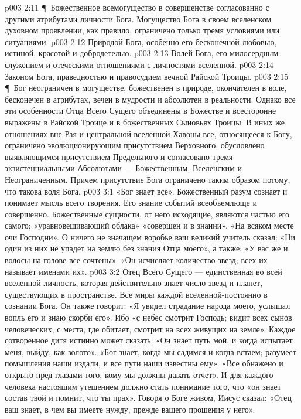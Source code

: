 \vs p003 2:11 \P\ Божественное всемогущество в совершенстве согласованно с другими атрибутами личности Бога. Могущество Бога в своем вселенском духовном проявлении, как правило, ограничено только тремя условиями или ситуациями:
\vs p003 2:12 \bibnobreakspace Природой Бога, особенно его бесконечной любовью, истиной, красотой и добродетелью.
\vs p003 2:13 \bibnobreakspace Волей Бога, его милосердным служением и отеческими отношениями с личностями вселенной.
\vs p003 2:14 \bibnobreakspace Законом Бога, праведностью и правосудием вечной Райской Троицы.
\vs p003 2:15 \P\ Бог неограничен в могуществе, божественен в природе, окончателен в воле, бесконечен в атрибутах, вечен в мудрости и абсолютен в реальности. Однако все эти особенности Отца Всего Сущего объединены в Божестве и всесторонне выражены в Райской Троице и в божественных Сыновьях Троицы. В иных же отношениях вне Рая и центральной вселенной Хавоны все, относящееся к Богу, ограничено эволюционирующим присутствием Верховного, обусловлено выявляющимся присутствием Предельного и согласовано тремя экзистенциальными Абсолютами --- Божественным, Вселенским и Неограниченным. Причем присутствие Бога ограничено таким образом потому, что такова воля Бога.
\vs p003 3:1 «Бог знает все». Божественный разум сознает и понимает мысль всего творения. Его знание событий всеобъемлюще и совершенно. Божественные сущности, от него исходящие, являются частью его самого; «уравновешивающий облака» «совершен и в знании». «На всяком месте очи Господни». О ничего не значащем воробье ваш великий учитель сказал: «Ни один из них не упадет на землю без знания Отца моего», а также: «У вас же и волосы на голове все сочтены». «Он исчисляет количество звезд; всех их называет именами их».
\vs p003 3:2 Отец Всего Сущего --- единственная во всей вселенной личность, которая действительно знает число звезд и планет, существующих в пространстве. Все миры каждой вселенной\hyp{}постоянно в сознании Бога. Он также говорит: «Я увидел страдание народа моего, услышал вопль его и знаю скорби его». Ибо «с небес смотрит Господь; видит всех сынов человеческих; с места, где обитает, смотрит на всех живущих на земле». Каждое сотворенное дитя истинно может сказать: «Он знает путь мой, и когда испытает меня, выйду, как золото». «Бог знает, когда мы садимся и когда встаем; разумеет помышления наши издали, и все пути наши известны ему». «Все обнажено и открыто пред глазами того, кому мы должны давать отчет». И для каждого человека настоящим утешением должно стать понимание того, что «он знает состав твой и помнит, что ты прах». Говоря о Боге живом, Иисус сказал: «Отец ваш знает, в чем вы имеете нужду, прежде вашего прошения у него».
